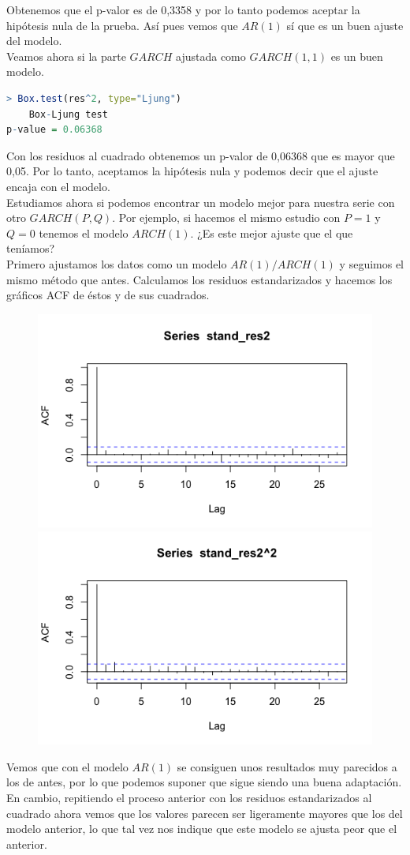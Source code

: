 \documentclass[a4paper,]{article}
\begin{document}
Obtenemos que el p-valor es de 0,3358 y por lo tanto podemos aceptar la hipótesis nula de la prueba. Así pues vemos que $AR(1)$ sí que es un buen ajuste del modelo. \\


Veamos ahora si la parte $GARCH$ ajustada como $GARCH(1,1)$ es un buen modelo.

\begin{lstlisting}[language=R]
> Box.test(res^2, type="Ljung")
	Box-Ljung test
p-value = 0.06368
\end{lstlisting}

Con los residuos al cuadrado obtenemos un p-valor de 0,06368 que es mayor que 0,05. Por lo tanto, aceptamos la hipótesis nula y podemos decir que el ajuste encaja con el modelo. \\


Estudiamos ahora si podemos encontrar un modelo mejor para nuestra serie con otro $GARCH(P,Q)$. Por ejemplo, si hacemos el mismo estudio con $P=1$ y $Q=0$ tenemos el modelo $ARCH(1)$. ¿Es este mejor ajuste que el que teníamos? \\

Primero ajustamos los datos como un modelo $AR(1)/ARCH(1)$ y seguimos el mismo método que antes. Calculamos los residuos estandarizados y hacemos los gráficos ACF de éstos y de sus cuadrados.
\begin{figure}[H]
    \centering
    \includegraphics[width=0.4\linewidth]{stand_res2.png}
    \includegraphics[width=0.4\linewidth]{stand_res2^2.png}  
\end{figure}

Vemos que con el modelo $AR(1)$ se consiguen unos resultados muy parecidos a los de antes, por lo que podemos suponer que sigue siendo una buena adaptación. En cambio, repitiendo el proceso anterior con los residuos estandarizados al cuadrado ahora vemos que los valores parecen ser ligeramente mayores que los del modelo anterior, lo que tal vez nos indique que este modelo se ajusta peor que el anterior. \\
\end{document}
